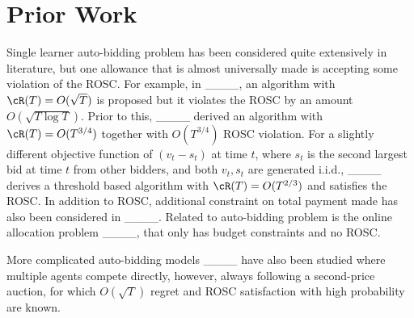 \section{Prior Work}
Single learner auto-bidding problem has been considered quite extensively in literature, but one allowance that is almost universally made is accepting some violation of the ROSC. For example, in ____, an algorithm with $\cR(T) = O(\sqrt{T})$ is proposed but it violates the ROSC by an amount  $O(\sqrt{T\log T})$. Prior to this, ____ derived an algorithm with $\cR(T) =O(T^{3/4})$ together with $O(T^{3/4})$ ROSC violation. For a slightly different objective function of $(v_t-s_t)$ at time $t$, where $s_t$ is the second largest bid at time $t$ from other bidders, and both $v_t,s_t$ are generated i.i.d., ____ derives a threshold based algorithm with $\cR(T) = O(T^{2/3})$ and satisfies the ROSC. In addition to ROSC, additional constraint on total payment made 
has also been considered in ____. 
Related to auto-bidding problem is the online allocation problem ____, that only has budget constraints and no ROSC.


More complicated auto-bidding models ____ 
have also been studied where multiple agents compete directly, however, always following a second-price auction, for which $O(\sqrt{T})$ regret and ROSC satisfaction with high probability are known. 


\vspace{-0.1in}